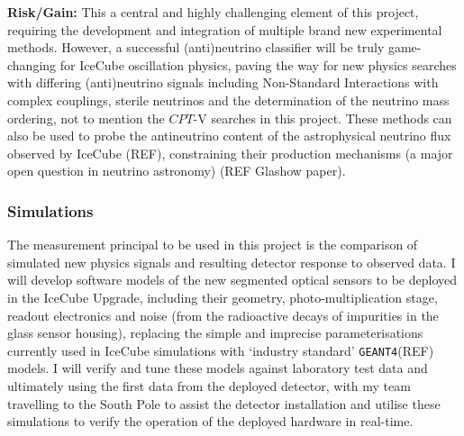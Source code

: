 \documentclass[a4paper,11pt]{article}
\begin{document}
\textbf{Risk/Gain:} This a central and highly challenging element of this project, requiring the development and integration of multiple brand new experimental methods. However, a successful (anti)neutrino classifier will be truly game-changing for IceCube oscillation physics, paving the way for new physics searches with differing (anti)neutrino signals including Non-Standard Interactions with complex couplings, sterile neutrinos and the determination of the neutrino mass ordering, not to mention the $CPT$-V searches in this project. These methods can also be used to probe the antineutrino content of the astrophysical neutrino flux observed by IceCube (REF), constraining their production mechanisms (a major open question in neutrino astronomy) (REF Glashow paper). \\


\subsubsection{Simulations}


The measurement principal to be used in this project is the comparison of simulated new physics signals and resulting detector response to observed data. I will develop software models of the new segmented optical sensors to be deployed in the IceCube Upgrade, including their geometry, photo-multiplication stage, readout electronics and noise (from the radioactive decays of impurities in the glass sensor housing), replacing the simple and imprecise parameterisations currently used in IceCube simulations with `industry standard' \texttt{GEANT4}(REF) models. I will verify and tune these models against laboratory test data and ultimately using the first data from the deployed detector, with my team travelling to the South Pole to assist the detector installation and utilise these simulations to verify the operation of the deployed hardware in real-time.
\end{document}
